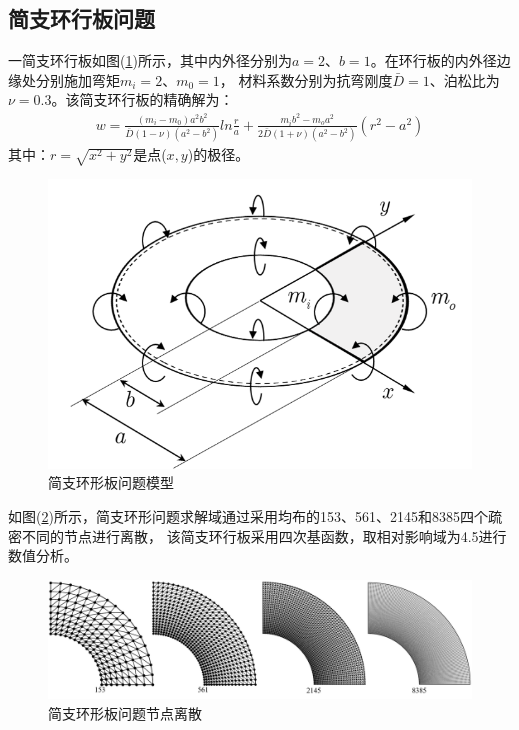 \subsection{简支环行板问题}
一简支环行板如图(\ref{annular})所示，其中内外径分别为$a=2$、$b=1$。在环行板的内外径边缘处分别施加弯矩$m_i=2$、$m_0=1$，
材料系数分别为抗弯刚度$\bar{D}=1$、泊松比为$\nu=0.3$。该简支环行板的精确解为：
\begin{equation}
\begin{split}
    w=\frac{(m_i-m_0)a^2b^2}{\bar D(1-\nu)(a^2-b^2)}ln\frac{r}{a}+\frac{m_ib^2-m_oa^2}{2\bar D(1+\nu)(a^2-b^2)}(r^2-a^2)
\end{split}
\end{equation}
其中：$r=\sqrt{x^2+y^2}$是点($x,y$)的极径。
\begin{figure}[H]
    \centering
    \includegraphics[scale=0.7]{figure/PHR/A/annular.png}
    \caption{简支环形板问题模型}\label{annular}
\end{figure}
如图(\ref{annularmsh})所示，简支环形问题求解域通过采用均布的153、561、2145和8385四个疏密不同的节点进行离散，
该简支环行板采用四次基函数，取相对影响域为4.5进行数值分析。\par
\begin{figure}[H]
    \centering
    \includegraphics[scale=0.4]{figure/PHR/A/annularmsh.png}
    \caption{简支环形板问题节点离散}\label{annularmsh}
\end{figure}
